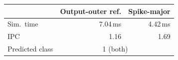\begin{tabular}{lrr}
\toprule
 & Output-outer ref. & Spike-major \\
\midrule
Sim.\ time & 7.04\,ms & 4.42\,ms \\
IPC & 1.16 & 1.69 \\
Predicted class & \multicolumn{2}{c}{1 (both)} \\
\bottomrule
\end{tabular}
